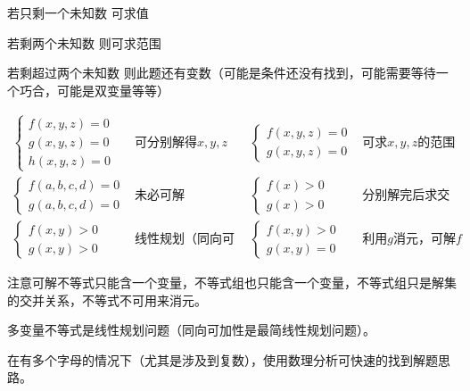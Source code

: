 \begin{desclist}
	\item[若只剩一个未知数] 可求值
	\item[若剩两个未知数] 则可求范围
	\item[若剩超过两个未知数] 则此题还有变数（可能是条件还没有找到，可能需要等待一个巧合，可能是双变量等等）
\end{desclist}
\[\begin{aligned}
	\begin{cases}
		f(x,y,z)=0 \\
		g(x,y,z)=0 \\
		h(x,y,z)=0
	\end{cases}&\text{可分别解得$x,y,z$}
	&\begin{cases}
		f(x,y,z)=0 \\
		g(x,y,z)=0
	\end{cases}&\text{可求$x,y,z$的范围} \\
	\begin{cases}
		f(a,b,c,d)=0 \\
		g(a,b,c,d)=0
	\end{cases}&\text{未必可解}
	&\begin{cases}
		f(x)>0 \\
		g(x)>0
	\end{cases}&\text{分别解完后求交集} \\
	\begin{cases}
		f(x,y)>0 \\
		g(x,y)>0
	\end{cases}&\text{线性规划（同向可加）}
	&\begin{cases}
		f(x,y)>0 \\
		g(x,y)=0
	\end{cases}&\text{利用$g$消元，可解$f$}
\end{aligned}\]

注意可解不等式只能含一个变量，不等式组也只能含一个变量，不等式组只是解集的交并关系，不等式不可用来消元。

多变量不等式是线性规划问题（同向可加性是最简线性规划问题）。

在有多个字母的情况下（尤其是涉及到复数），使用数理分析可快速的找到解题思路。
